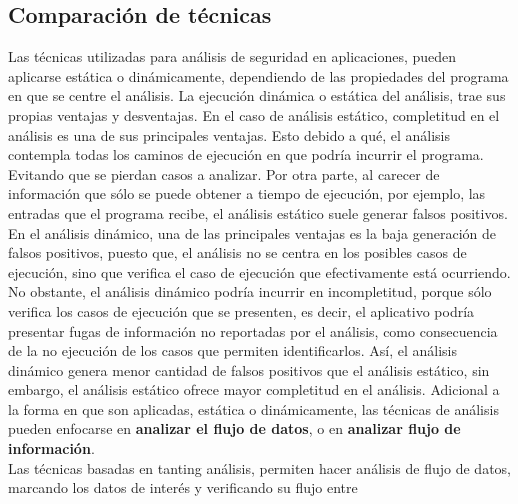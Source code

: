 \subsection{Comparación de técnicas}
Las técnicas utilizadas para análisis de seguridad en aplicaciones, pueden
aplicarse estática o dinámicamente, dependiendo de las propiedades del programa
en que se centre el análisis.\newline
La ejecución dinámica o estática del análisis, trae sus propias ventajas y
desventajas. En el caso de análisis estático, completitud en el análisis es una
de sus principales ventajas. Esto debido a qué, el análisis contempla todas los
caminos de ejecución en que podría incurrir el programa. Evitando que se pierdan
casos a analizar. Por otra parte, al carecer de información que sólo se puede
obtener a tiempo de ejecución, por ejemplo, las entradas que el programa
recibe, el análisis estático suele generar falsos positivos.\newline
En el análisis dinámico, una de las principales ventajas es la baja generación
de falsos positivos, puesto que, el análisis no se centra en los posibles casos
de ejecución, sino que verifica el caso de ejecución que efectivamente está
ocurriendo. No obstante, el análisis dinámico podría incurrir en incompletitud,
porque sólo verifica los casos de ejecución que se presenten, es decir, el
aplicativo podría presentar fugas de información no reportadas por el análisis,
como consecuencia de la no ejecución de los casos que permiten identificarlos.\newline 
Así, el análisis dinámico genera menor cantidad de falsos positivos que el
análisis estático, sin embargo, el análisis estático ofrece mayor completitud en
el análisis.\newline
Adicional a la forma en que son aplicadas, estática o dinámicamente, las
técnicas de análisis pueden enfocarse en \textbf{analizar el flujo de
datos}, o en \textbf{analizar flujo de información}.\\
Las técnicas basadas en tanting análisis, permiten hacer análisis de flujo de
datos, marcando los datos de interés y verificando su flujo entre
